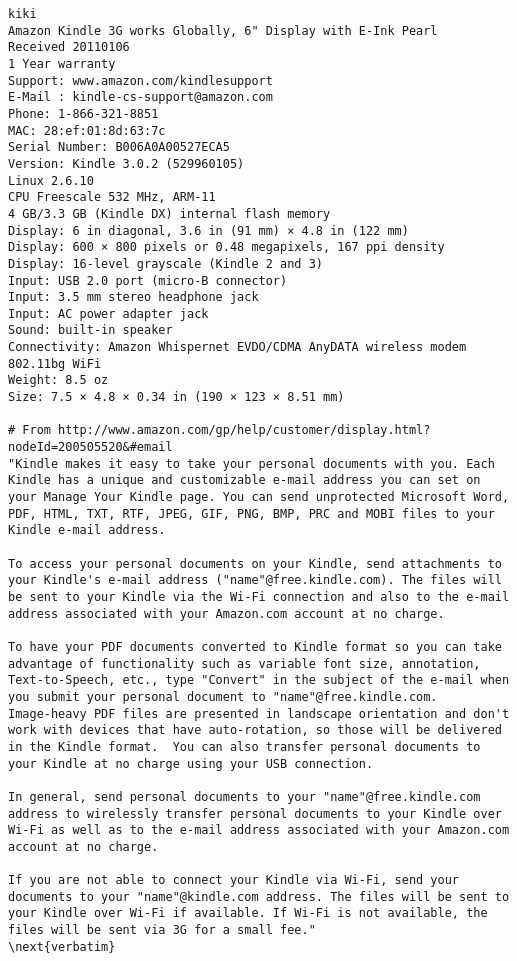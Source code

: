 \documentclass[12pt,twoside]{article}
\begin{document}
\begin{verbatim}
kiki
Amazon Kindle 3G works Globally, 6" Display with E-Ink Pearl 
Received 20110106
1 Year warranty
Support: www.amazon.com/kindlesupport
E-Mail : kindle-cs-support@amazon.com
Phone: 1-866-321-8851
MAC: 28:ef:01:8d:63:7c
Serial Number: B006A0A00527ECA5
Version: Kindle 3.0.2 (529960105)
Linux 2.6.10
CPU Freescale 532 MHz, ARM-11
4 GB/3.3 GB (Kindle DX) internal flash memory
Display: 6 in diagonal, 3.6 in (91 mm) × 4.8 in (122 mm)
Display: 600 × 800 pixels or 0.48 megapixels, 167 ppi density
Display: 16-level grayscale (Kindle 2 and 3)
Input: USB 2.0 port (micro-B connector)
Input: 3.5 mm stereo headphone jack
Input: AC power adapter jack
Sound: built-in speaker
Connectivity: Amazon Whispernet EVDO/CDMA AnyDATA wireless modem 802.11bg WiFi
Weight: 8.5 oz
Size: 7.5 × 4.8 × 0.34 in (190 × 123 × 8.51 mm) 

# From http://www.amazon.com/gp/help/customer/display.html?nodeId=200505520&#email
"Kindle makes it easy to take your personal documents with you. Each
Kindle has a unique and customizable e-mail address you can set on
your Manage Your Kindle page. You can send unprotected Microsoft Word,
PDF, HTML, TXT, RTF, JPEG, GIF, PNG, BMP, PRC and MOBI files to your
Kindle e-mail address. 

To access your personal documents on your Kindle, send attachments to
your Kindle's e-mail address ("name"@free.kindle.com). The files will
be sent to your Kindle via the Wi-Fi connection and also to the e-mail
address associated with your Amazon.com account at no charge. 

To have your PDF documents converted to Kindle format so you can take
advantage of functionality such as variable font size, annotation,
Text-to-Speech, etc., type "Convert" in the subject of the e-mail when
you submit your personal document to "name"@free.kindle.com. 
Image-heavy PDF files are presented in landscape orientation and don't
work with devices that have auto-rotation, so those will be delivered
in the Kindle format.  You can also transfer personal documents to
your Kindle at no charge using your USB connection. 

In general, send personal documents to your "name"@free.kindle.com
address to wirelessly transfer personal documents to your Kindle over
Wi-Fi as well as to the e-mail address associated with your Amazon.com
account at no charge. 

If you are not able to connect your Kindle via Wi-Fi, send your
documents to your "name"@kindle.com address. The files will be sent to
your Kindle over Wi-Fi if available. If Wi-Fi is not available, the
files will be sent via 3G for a small fee."
\next{verbatim}


\end{verbatim}
\end{document}
